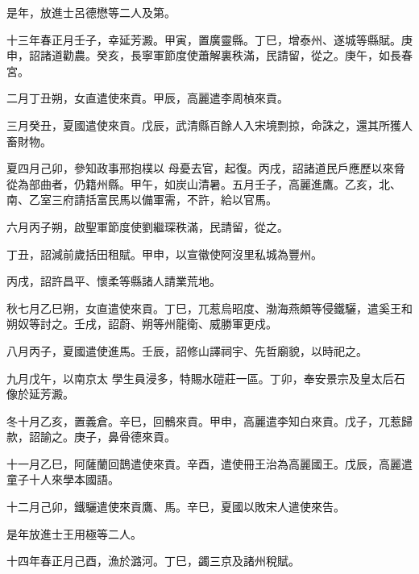 \begin{pinyinscope}
 是年，放進士呂德懋等二人及第。



 十三年春正月壬子，幸延芳澱。甲寅，置廣靈縣。丁巳，增泰州、遂城等縣賦。庚申，詔諸道勸農。癸亥，長寧軍節度使蕭解裏秩滿，民請留，從之。庚午，如長春宮。



 二月丁丑朔，女直遣使來貢。甲辰，高麗遣李周楨來貢。



 三月癸丑，夏國遣使來貢。戊辰，武清縣百餘人入宋境剽掠，命誅之，還其所獲人畜財物。



 夏四月己卯，參知政事邢抱樸以
 母憂去官，起復。丙戌，詔諸道民戶應歷以來脅從為部曲者，仍籍州縣。甲午，如炭山清暑。五月壬子，高麗進鷹。乙亥，北、南、乙室三府請括富民馬以備軍需，不許，給以官馬。



 六月丙子朔，啟聖軍節度使劉繼琛秩滿，民請留，從之。



 丁丑，詔減前歲括田租賦。甲申，以宣徽使阿沒里私城為豐州。



 丙戌，詔許昌平、懷柔等縣諸人請業荒地。



 秋七月乙巳朔，女直遣使來貢。丁巳，兀惹烏昭度、渤海燕頗等侵鐵驪，遣奚王和朔奴等討之。壬戌，詔蔚、朔等州龍衛、威勝軍更戍。



 八月丙子，夏國遣使進馬。壬辰，詔修山譯祠宇、先哲廟貌，以時祀之。



 九月戊午，以南京太
 學生員浸多，特賜水磑莊一區。丁卯，奉安景宗及皇太后石像於延芳澱。



 冬十月乙亥，置義倉。辛巳，回鶻來貢。甲申，高麗遣李知白來貢。戊子，兀惹歸款，詔諭之。庚子，鼻骨德來貢。



 十一月乙巳，阿薩蘭回鵲遣使來貢。辛酉，遣使冊王治為高麗國王。戊辰，高麗遣童子十人來學本國語。



 十二月己卯，鐵驪遣使來貢鷹、馬。辛巳，夏國以敗宋人遣使來告。



 是年放進士王用極等二人。



 十四年春正月己酉，漁於潞河。丁巳，蠲三京及諸州稅賦。




\end{pinyinscope}
